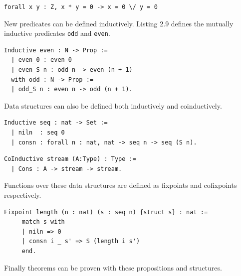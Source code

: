 \documentclass[12pt,twoside,notitlepage]{report}
\begin{document}
\begin{lstlisting}[language={Coq},caption={Coq Prop predicate example},label={lst:coqpredex}]
forall x y : Z, x * y = 0 -> x = 0 \/ y = 0
\end{lstlisting}


New predicates can be defined inductively.  Listing 2.9 defines the mutually inductive predicates \lstinline[language={Coq}]|odd| and \lstinline[language={Coq}]|even|.


\begin{lstlisting}[language={Coq},caption={Coq Prop new predicate example}]
 Inductive even : N -> Prop :=
  | even_0 : even 0
  | even_S n : odd n -> even (n + 1)
  with odd : N -> Prop :=
  | odd_S n : even n -> odd (n + 1).
\end{lstlisting}


Data structures can also be defined both inductively and coinductively.


\begin{lstlisting}[language={Coq},caption={Coq inductive data structure example}]
 Inductive seq : nat -> Set :=
  | niln  : seq 0
  | consn : forall n : nat, nat -> seq n -> seq (S n).
\end{lstlisting}



\begin{lstlisting}[language={Coq},caption={Coq coinductive data structure example}]
 CoInductive stream (A:Type) : Type :=
  | Cons : A -> stream -> stream.
\end{lstlisting}


Functions over these data structures are defined as fixpoints and cofixpoints respectively.


\begin{lstlisting}[language={Coq},caption={Coq fixpoint example}]
 Fixpoint length (n : nat) (s : seq n) {struct s} : nat := 
     match s with
     | niln => 0
     | consn i _ s' => S (length i s')
     end.
\end{lstlisting}


Finally theorems can be proven with these propositions and structures.
\vspace{3mm}
\end{document}
